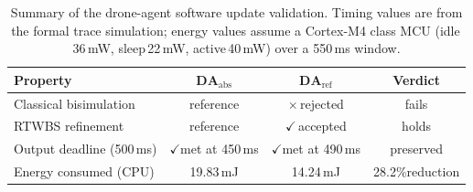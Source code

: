 
\begin{table}[t]
\centering
\caption{Summary of the drone-agent software update validation.
  Timing values are from the formal trace simulation;
  energy values assume a Cortex-M4 class MCU
  (idle\,36\,mW, sleep\,22\,mW, active\,40\,mW) over a 550\,ms window.}
\label{tab:results}
\small
\begin{tabular}{l c c c}
\toprule
\textbf{Property} & $\mathbf{DA}_{\mathrm{abs}}$ & $\mathbf{DA}_{\mathrm{ref}}$ & \textbf{Verdict} \\
\midrule
Classical bisimulation  & reference            & $\times$\,rejected   & fails  \\
RTWBS refinement        & reference            & $\checkmark$\,accepted  & holds  \\
Output deadline (500\,ms) & $\checkmark$\;met at 450\,ms & $\checkmark$\;met at 490\,ms & preserved \\
Energy consumed (CPU)   & 19.83\,mJ             & 14.24\,mJ             & 28.2\%\;reduction \\
\bottomrule
\end{tabular}
\end{table}

